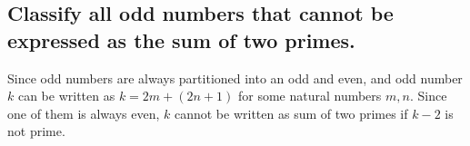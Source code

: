 \begin{parts}
\part{
    Classify all odd numbers that
    cannot be expressed as the sum
    of two primes.
}
\begin{solution}
    Since odd numbers are always
    partitioned into an odd and even,
    and odd number $k$ can be written
    as $k=2m+(2n+1)$ for some natural
    numbers $m,n$. Since one of them
    is always even, $k$ cannot be
    written as sum of two primes if
    $k-2$ is not prime.
\end{solution}
\end{parts}